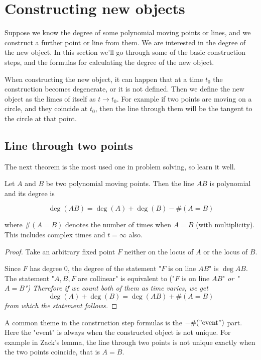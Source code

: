 \documentclass[a4paper]{article}
\begin{document}
\section{Constructing new objects}

Suppose we know the degree of some polynomial moving points or lines, and we construct a further point or line from them. We are interested in the degree of the new object. In this section we'll go through some of the basic construction steps, and the formulas for calculating the degree of the new object.

\begin{remark}
    When constructing the new object, it can happen that at a time $t_0$ the construction becomes degenerate, or it is not defined. Then we define the new object as the limes of itself as $t\rightarrow t_0$.
    For example if two points are moving on a circle, and they coincide at $t_0$, then the line through them will be the tangent to the circle at that point.
\end{remark}

\subsection{Line through two points}

The next theorem is the most used one in problem solving, so learn it well.

\begin{theorem}\label{l-pp}
    Let $A$ and $B$ be two polynomial moving points. Then the line $AB$ is polynomial and its degree is

$$\deg (AB)= \deg (A) + \deg (B) - \# (A=B)$$

where $\# (A=B)$ denotes the number of times when $A=B$ (with multiplicity). This includes complex times and $t=\infty$ also.
\end{theorem}
\begin{proof}
    Take an arbitrary fixed point $F$ neither on the locus of $A$ or the locus of $B$.

    Since $F$ has degree 0, the degree of the statement "$F$ is on line $AB$" is $\deg AB$. The statement "$A, B, F$ are collinear" is equivalent to ("$F$ is on line $AB$" \it{or} \rm "$A=B$") Therefore if we count both of them as time varies, we get
    $$\deg (A) + \deg (B)= \deg (AB) + \# (A=B)$$
    from which the statement follows.
\end{proof}

\begin{remark}
    A common theme in the construction step formulas is the $-\#("\text{event}")$ part. Here the "event" is always when the constructed object is not unique. For example in Zack's lemma, the line through two points is not unique exactly when the two points coincide, that is $A=B$.
\end{remark}
\end{document}
